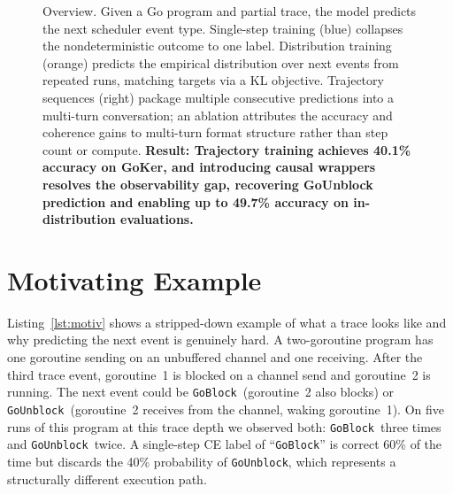 \documentclass[10pt,conference]{IEEEtran}
\newcommand{\eblock}{\texttt{GoBlock}}
\newcommand{\eunblock}{\texttt{GoUnblock}}
\begin{document}
\begin{figure}[t]
{}
\caption{Overview. Given a Go program and partial trace, the model
predicts the next scheduler event type. Single-step training (blue)
collapses the nondeterministic outcome to one label.
Distribution training (orange) predicts the empirical distribution
over next events from repeated runs, matching targets via a KL objective.
Trajectory sequences (right) package multiple consecutive predictions
into a multi-turn conversation; an ablation attributes the accuracy and
coherence gains to multi-turn format structure rather than step count
or compute.
\textbf{Result: Trajectory training achieves 40.1\% accuracy on GoKer, and introducing causal wrappers resolves the observability gap, recovering GoUnblock prediction and enabling up to 49.7\% accuracy on in-distribution evaluations.}}
\label{fig:teaser}
\end{figure}

\section{Motivating Example}\label{sec:motivating}

Listing~\ref{lst:motiv} shows a stripped-down example of what a trace
looks like and why predicting the next event is genuinely hard.
A two-goroutine program has one goroutine sending on an unbuffered
channel and one receiving.
After the third trace event, goroutine~1 is blocked on a channel send
and goroutine~2 is running.
The next event could be \eblock\ (goroutine~2 also blocks) or
\eunblock\ (goroutine~2 receives from the channel, waking goroutine~1).
On five runs of this program at this trace depth we observed both:
\eblock\ three times and \eunblock\ twice.
A single-step CE label of ``\eblock'' is correct 60\% of the time but
discards the 40\% probability of \eunblock, which represents a
structurally different execution path.
\end{document}
